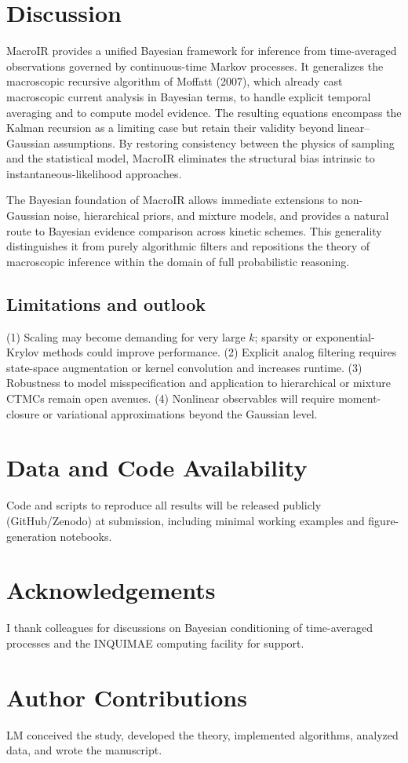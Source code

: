 \documentclass[9pt]{elife}
\begin{document}
	\section*{Discussion}
	
	MacroIR provides a unified Bayesian framework for inference from time-averaged observations governed by continuous-time Markov processes. 
	It generalizes the macroscopic recursive algorithm of Moffatt (2007), which already cast macroscopic current analysis in Bayesian terms, to handle explicit temporal averaging and to compute model evidence. 
	The resulting equations encompass the Kalman recursion as a limiting case but retain their validity beyond linear–Gaussian assumptions.  
	By restoring consistency between the physics of sampling and the statistical model, MacroIR eliminates the structural bias intrinsic to instantaneous-likelihood approaches.
	
	The Bayesian foundation of MacroIR allows immediate extensions to non-Gaussian noise, hierarchical priors, and mixture models, and provides a natural route to Bayesian evidence comparison across kinetic schemes. 
	This generality distinguishes it from purely algorithmic filters and repositions the theory of macroscopic inference within the domain of full probabilistic reasoning.
	
	\subsection*{Limitations and outlook}
	(1) Scaling may become demanding for very large $k$; sparsity or exponential-Krylov methods could improve performance. 
	(2) Explicit analog filtering requires state-space augmentation or kernel convolution and increases runtime. 
	(3) Robustness to model misspecification and application to hierarchical or mixture CTMCs remain open avenues. 
	(4) Nonlinear observables will require moment-closure or variational approximations beyond the Gaussian level.
	
	\section*{Data and Code Availability}
	Code and scripts to reproduce all results will be released publicly (GitHub/Zenodo) at submission, including minimal working examples and figure-generation notebooks.
	
	\section*{Acknowledgements}
	I thank colleagues for discussions on Bayesian conditioning of time-averaged processes and the INQUIMAE computing facility for support.
	
	\section*{Author Contributions}
	LM conceived the study, developed the theory, implemented algorithms, analyzed data, and wrote the manuscript.
	
	
	
\end{document}

